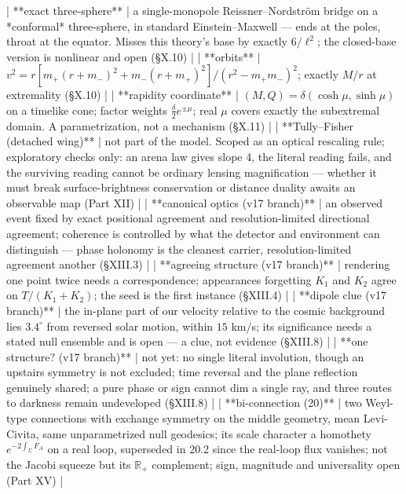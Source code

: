 | **exact three-sphere** | a single-monopole Reissner–Nordström bridge on a *conformal* three-sphere, in standard Einstein–Maxwell — ends at the poles, throat at the equator. Misses this theory's base by exactly $6/\ell^2$; the closed-base version is nonlinear and open (§X.10) |
| **orbits** | $v^2 = r[m_+(r+m_-)^2+m_-(r+m_+)^2]/(r^2-m_+m_-)^2$; exactly $M/r$ at extremality (§X.10) |
| **rapidity coordinate** | $(M,Q) = \delta(\cosh\mu,\sinh\mu)$ on a timelike cone; factor weights $\tfrac\delta2e^{\pm\mu}$; real $\mu$ covers exactly the subextremal domain. A parametrization, not a mechanism (§X.11) |
| **Tully–Fisher (detached wing)** | not part of the model. Scoped as an optical rescaling rule; exploratory checks only: an arena law gives slope 4, the literal reading fails, and the surviving reading cannot be ordinary lensing magnification — whether it must break surface-brightness conservation or distance duality awaits an observable map (Part XII) |
| **canonical optics (v17 branch)** | an observed event fixed by exact positional agreement and resolution-limited directional agreement; coherence is controlled by what the detector and environment can distinguish — phase holonomy is the cleanest carrier, resolution-limited agreement another (§XIII.3) |
| **agreeing structure (v17 branch)** | rendering one point twice needs a correspondence; appearances forgetting $K_1$ and $K_2$ agree on $T/(K_1+K_2)$; the seed is the first instance (§XIII.4) |
| **dipole clue (v17 branch)** | the in-plane part of our velocity relative to the cosmic background lies $3.4^\circ$ from reversed solar motion, within $15$ km/s; its significance needs a stated null ensemble and is open — a clue, not evidence (§XIII.8) |
| **one structure? (v17 branch)** | not yet: no single literal involution, though an upstairs symmetry is not excluded; time reversal and the plane reflection genuinely shared; a pure phase or sign cannot dim a single ray, and three routes to darkness remain undeveloped (§XIII.8) |
| **bi-connection (20)** | two Weyl-type connections with exchange symmetry on the middle geometry, mean Levi-Civita, same unparametrized null geodesics; its scale character a homothety $e^{-2\int_\Sigma F_A}$ on a real loop, superseded in 20.2 since the real-loop flux vanishes; not the Jacobi squeeze but its $\mathbb R_+$ complement; sign, magnitude and universality open (Part XV) |
